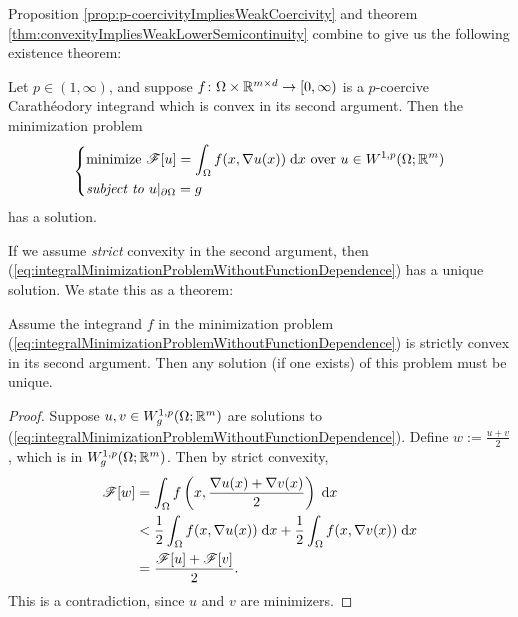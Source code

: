 Proposition \ref{prop:p-coercivityImpliesWeakCoercivity} and theorem \ref{thm:convexityImpliesWeakLowerSemicontinuity} combine to give us the following existence theorem:
\begin{theorem}
    Let $p \in (1,\infty)$, and suppose $f \colon \Omega \times \mathbb{R}^{m \times d} \to [0,\infty)$ is a $p$-coercive Carath\'eodory integrand which is convex in its second argument. Then the minimization problem 
    \begin{equation} \label{eq:integralMinimizationProblemWithoutFunctionDependence}
        \begin{dcases}
            \text{minimize } \mathscr{F}[u] = \int_\Omega f(x,\nabla u(x)) \; \mathrm{d} x \text{ over } u \in W^{1,p}(\Omega;\mathbb{R}^m) \\
            \textit{subject to } u\vert_{\partial\Omega} = g
        \end{dcases}
    \end{equation}
    has a solution.
\end{theorem}
If we assume \textit{strict} convexity in the second argument, then (\ref{eq:integralMinimizationProblemWithoutFunctionDependence}) has a unique solution. We state this as a theorem:
\begin{proposition} \label{prop:strictConvexityImpliesUniqueness}
    Assume the integrand $f$ in the minimization problem (\ref{eq:integralMinimizationProblemWithoutFunctionDependence}) is strictly convex in its second argument. Then any solution (if one exists) of this problem must be unique.
\end{proposition}
\begin{proof}
    Suppose $u,v \in W^{1,p}_g(\Omega;\mathbb{R}^m)$ are solutions to (\ref{eq:integralMinimizationProblemWithoutFunctionDependence}). Define $w := \frac{u+v}{2}$, which is in $W^{1,p}_g(\Omega;\mathbb{R}^m)$. Then by strict convexity,
    \begin{equation}
        \begin{aligned}
            \mathscr{F}[w] &= \int_\Omega f\left(x, \frac{\nabla u(x) + \nabla v(x)}{2}\right) \; \mathrm{d} x                            \\
                     &< \frac{1}{2} \int_\Omega f(x,\nabla u(x)) \; \mathrm{d} x + \frac{1}{2} \int_\Omega f(x,\nabla v(x)) \; \mathrm{d} x \\
                     &= \frac{\mathscr{F}[u] + \mathscr{F}[v]}{2}.
        \end{aligned}
    \end{equation}
    This is a contradiction, since $u$ and $v$ are minimizers.
\end{proof}
